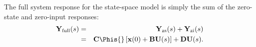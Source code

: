 The full system response for the state-space model is simply the
sum of the zero-state and zero-input responses:
\begin{eqnarray*}\mathbf{Y}_{\mathrm{full}}(s) &=& \mathbf{Y}_{\mathrm{zs}}(s) +
\mathbf{Y}_{\mathrm{zi}}(s)\\ &=&
\mathbf{C}\Phis{}\left[\mathbf{x}(0)+\mathbf{B}\mathbf{U}(s)\right] + \mathbf{DU}(s).\end{eqnarray*}
\endinput
